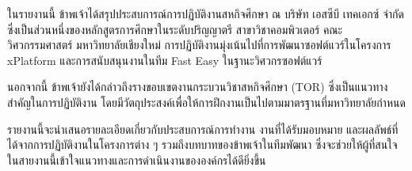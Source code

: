 \maketitle
\makesignature

\ifproject
\begin{abstractTH}
    ในรายงานนี้ ข้าพเจ้าได้สรุปประสบการณ์การปฏิบัติงานสหกิจศึกษา ณ บริษัท เอสซีบี เทคเอกซ์ จำกัด ซึ่งเป็นส่วนหนึ่งของหลักสูตรการศึกษาในระดับปริญญาตรี สาขาวิชาคอมพิวเตอร์ คณะวิศวกรรมศาสตร์ มหาวิทยาลัยเชียงใหม่ การปฏิบัติงานมุ่งเน้นไปที่การพัฒนาซอฟต์แวร์ในโครงการ xPlatform และการสนับสนุนงานในทีม Fast Easy ในฐานะวิศวกรซอฟต์แวร์
    
    นอกจากนี้ ข้าพเจ้ายังได้กล่าวถึงรางขอบเขตงานกระบวนวิชาสหกิจศึกษา (TOR) ซึ่งเป็นแนวทางสำคัญในการปฏิบัติงาน โดยมีวัตถุประสงค์เพื่อให้การฝึกงานเป็นไปตามมาตรฐานที่มหาวิทยาลัยกำหนด
    
    รายงานนี้จะนำเสนอรายละเอียดเกี่ยวกับประสบการณ์การทำงาน งานที่ได้รับมอบหมาย และผลลัพธ์ที่ได้จากการปฏิบัติงานในโครงการต่าง ๆ รวมถึงบทบาทของข้าพเจ้าในทีมพัฒนา ซึ่งจะช่วยให้ผู้ที่สนใจในสายงานนี้เข้าใจแนวทางและการดำเนินงานขององค์กรได้ดียิ่งขึ้น
\end{abstractTH}
    
    


\iffalse
\begin{dedication}
This document is dedicated to all Chiang Mai University students.

Dedication page is optional.
\end{dedication}
\fi %

